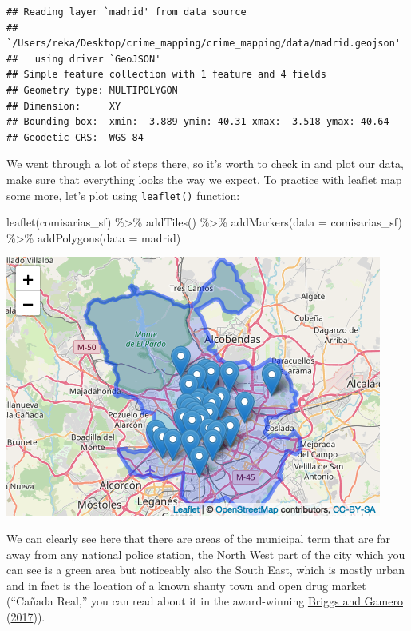 \documentclass[
  krantz2]{krantz}
\makeatletter
\newenvironment{Shaded}{\begin{snugshade}}{\end{snugshade}}
\newcommand{\AttributeTok}[1]{\textcolor[rgb]{0.61,0.61,0.61}{#1}}
\newcommand{\FunctionTok}[1]{\textcolor[rgb]{0,0,0}{#1}}
\newcommand{\NormalTok}[1]{#1}
\newcommand{\SpecialCharTok}[1]{\textcolor[rgb]{0,0,0}{#1}}
\newenvironment{kframe}{%
\medskip{}
\setlength{\fboxsep}{.8em}
 \def\at@end@of@kframe{}%
 \ifinner\ifhmode%
  \def\at@end@of@kframe{\end{minipage}}%
  \begin{minipage}{\columnwidth}%
 \fi\fi%
 \def\FrameCommand##1{\hskip\@totalleftmargin \hskip-\fboxsep
 \colorbox{shadecolor}{##1}\hskip-\fboxsep
     \hskip-\linewidth \hskip-\@totalleftmargin \hskip\columnwidth}%
 \MakeFramed {\advance\hsize-\width
   \@totalleftmargin\z@ \linewidth\hsize
   \@setminipage}}%
 {\par\unskip\endMakeFramed%
 \at@end@of@kframe}
\renewenvironment{Shaded}{\begin{kframe}}{\end{kframe}}
\makeatother
\begin{document}
\begin{verbatim}
## Reading layer `madrid' from data source 
##   `/Users/reka/Desktop/crime_mapping/crime_mapping/data/madrid.geojson' 
##   using driver `GeoJSON'
## Simple feature collection with 1 feature and 4 fields
## Geometry type: MULTIPOLYGON
## Dimension:     XY
## Bounding box:  xmin: -3.889 ymin: 40.31 xmax: -3.518 ymax: 40.64
## Geodetic CRS:  WGS 84
\end{verbatim}

We went through a lot of steps there, so it's worth to check in and plot our data, make sure that everything looks the way we expect. To practice with leaflet map some more, let's plot using \texttt{leaflet()} function:

\begin{Shaded}
\begin{Highlighting}[]
\FunctionTok{leaflet}\NormalTok{(comisarias\_sf) }\SpecialCharTok{\%\textgreater{}\%} \FunctionTok{addTiles}\NormalTok{() }\SpecialCharTok{\%\textgreater{}\%}
  \FunctionTok{addMarkers}\NormalTok{(}\AttributeTok{data =}\NormalTok{ comisarias\_sf) }\SpecialCharTok{\%\textgreater{}\%}
  \FunctionTok{addPolygons}\NormalTok{(}\AttributeTok{data =}\NormalTok{ madrid)}
\end{Highlighting}
\end{Shaded}

\includegraphics{crime_mapping_files/figure-latex/unnamed-chunk-60-1.png}

We can clearly see here that there are areas of the municipal term that are far away from any national police station, the North West part of the city which you can see is a green area but noticeably also the South East, which is mostly urban and in fact is the location of a known shanty town and open drug market (``Cañada Real,'' you can read about it in the award-winning \protect\hyperlink{ref-Briggs_2017}{Briggs and Gamero} (\protect\hyperlink{ref-Briggs_2017}{2017})).
\end{document}
